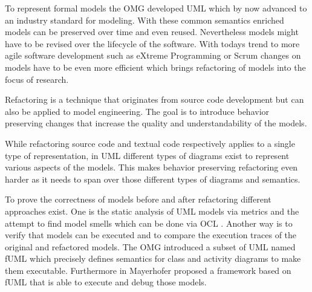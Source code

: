 \documentclass{llncs}
\begin{document}

To represent formal models the OMG developed UML \cite{man:UML} which by now advanced to an industry standard for 
modeling. With these common semantics enriched models can be preserved over time and even reused. Nevertheless models 
might have to be revised over the lifecycle of the software. With todays trend to more agile software 
development such as eXtreme Programming \cite{DBLP:journals/computer/Beck99} or Scrum \cite{DBLP:journals/software/RisingJ00} 
changes on models have to be even more efficient which brings refactoring of models into the focus of research.


Refactoring is a technique that originates from source code development but can also be applied to model engineering.
The goal is to introduce behavior preserving changes \cite{mast:REFOOF} that increase the quality and understandability
of the models.


While refactoring source code and textual code respectively applies to a single type of representation, in UML different
types of diagrams exist to represent various aspects of the models. This makes behavior preserving refactoring even harder 
as it needs to span over those different types of diagrams and semantics.


To prove the correctness of models before and after refactoring different approaches exist. One is the static analysis of
UML models via metrics and the attempt to find model smells \cite{DBLP:conf/models/ArendtTW13} which can be done via
OCL \cite{man:OCL}. Another way is to verify that models can be executed and to compare the execution traces of the 
original and refactored models. The OMG introduced a subset 
of UML named fUML \cite{man:FUML} which precisely defines semantics for class and activity diagrams to make them 
executable. 
Furthermore in \cite{DBLP:conf/icse/Mayerhofer12} Mayerhofer proposed a framework based on fUML that is able to execute
and debug those models.
\end{document}

